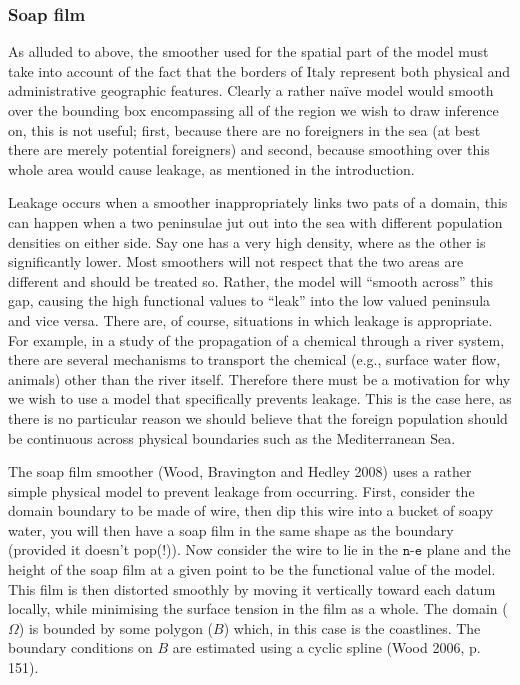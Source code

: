 \documentclass[10pt] {article}
\theoremstyle{definition}
\theoremstyle{plain}
\begin{document}
\subsubsection{Soap film \label{SF}}

As alluded to above, the smoother used for the spatial part of the model must take into account of the fact that the borders of Italy represent both physical and administrative geographic features. Clearly a rather na\"ive model would smooth over the bounding box encompassing all of the region we wish to draw inference on, this is not useful; first, because there are no foreigners in the sea (at best there are merely potential foreigners) and second, because smoothing over this whole area would cause leakage, as mentioned in the introduction.

Leakage occurs when a smoother inappropriately links two pats of a domain, this can happen when a two peninsulae jut out into the sea with different population densities on either side. Say one has a very high density, where as the other is significantly lower. Most smoothers will not respect that the two areas are different and should be treated so. Rather, the model will ``smooth across'' this gap, causing the high functional values to ``leak'' into the low valued peninsula and vice versa. There are, of course, situations in which leakage is appropriate. For example, in a study of the propagation of a chemical through a river system, there are several mechanisms to transport the chemical (e.g., surface water flow, animals) other than the river itself. Therefore there must be a motivation for why we wish to use a model that specifically prevents leakage. This is the case here, as there is no particular reason we should believe that the foreign population should be continuous across physical boundaries such as the Mediterranean Sea.

The soap film smoother (Wood, Bravington and Hedley 2008) uses a rather simple physical model to prevent leakage from occurring. First, consider the domain boundary to be made of wire, then dip this wire into a bucket of soapy water, you will then have a soap film in the same shape as the boundary (provided it doesn't pop(!)). Now consider the wire to lie in the $\texttt{n}$-$\texttt{e}$ plane and the height of the soap film at a given point to be the functional value of the model. This film is then distorted smoothly by moving it vertically toward each datum locally, while minimising the surface tension in the film as a whole. The domain ($\Omega$) is bounded by some polygon ($B$) which, in this case is the coastlines. The boundary conditions on $B$ are estimated using a cyclic spline (Wood 2006, p. 151).
\end{document}
